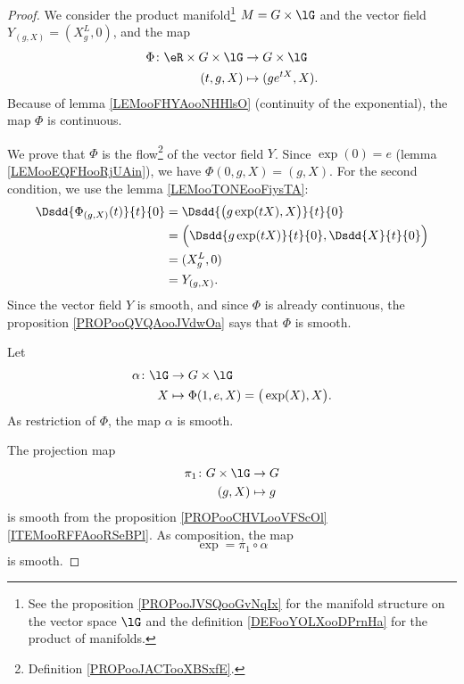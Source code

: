 \begin{proof}
	We consider the product manifold\footnote{See the proposition \ref{PROPooJVSQooGvNqIx} for the manifold structure on the vector space \( \lG\) and the definition \ref{DEFooYOLXooDPrnHa} for the product of manifolds.} \( M=G\times \lG\) and the vector field \( Y_{(g,X)}=(X^L_g,0)\), and the map
	\begin{equation}
		\begin{aligned}
			\Phi\colon \eR\times G\times \lG & \to G\times \lG         \\
			(t,g,X)                          & \mapsto (g e^{tX}, X) .
		\end{aligned}
	\end{equation}
	Because of lemma \ref{LEMooFHYAooNHHlsO} (continuity of the exponential), the map \( \Phi\) is continuous.

	We prove that \( \Phi\) is the flow\footnote{Definition \ref{PROPooJACTooXBSxfE}.} of the vector field \( Y\). Since \( \exp(0)=e\) (lemma \ref{LEMooEQFHooRjUAin}), we have \( \Phi(0,g,X)=(g,X)\). For the second condition, we use the lemma \ref{LEMooTONEooFiysTA}:
	\begin{subequations}
		\begin{align}
			\Dsdd{ \Phi_{(g,X)}(t) }{t}{0} & =\Dsdd{ \big( g\exp(tX),X \big) }{t}{0}                \\
			                               & =\Big( \Dsdd{ g\exp(tX) }{t}{0},\Dsdd{ X }{t}{0} \Big) \\
			                               & =(X^L_g,0)                                             \\
			                               & =Y_{(g,X)}.
		\end{align}
	\end{subequations}
	Since the vector field \( Y\) is smooth, and since \( \Phi\) is already continuous, the proposition \ref{PROPooQVQAooJVdwOa} says that \( \Phi\) is smooth.

	Let
	\begin{equation}
		\begin{aligned}
			\alpha\colon \lG & \to G\times \lG                            \\
			X                & \mapsto \Phi(1,e,X)=\big( \exp(X),X \big).
		\end{aligned}
	\end{equation}
	As restriction of \( \Phi\), the map \( \alpha\) is smooth.

	The projection map
	\begin{equation}
		\begin{aligned}
			\pi_1\colon G\times \lG & \to G     \\
			(g,X)                   & \mapsto g
		\end{aligned}
	\end{equation}
	is smooth from the proposition \ref{PROPooCHVLooVFScOl}\ref{ITEMooRFFAooRSeBPl}. As composition, the map
	\begin{equation}
		\exp=\pi_1\circ\alpha
	\end{equation}
	is smooth.
\end{proof}

